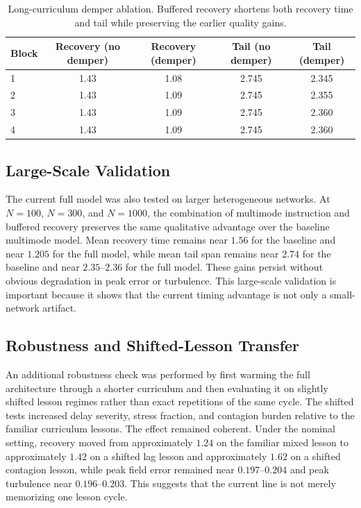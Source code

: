 \documentclass[12pt,a4paper]{article}
\begin{document}
\begin{table}[H]
    \centering
    \begin{tabular}{lcccc}
        \toprule
        Block & Recovery (no demper) & Recovery (demper) & Tail (no demper) & Tail (demper) \\
        \midrule
        1 & 1.43 & 1.08 & 2.745 & 2.345 \\
        2 & 1.43 & 1.09 & 2.745 & 2.355 \\
        3 & 1.43 & 1.09 & 2.745 & 2.360 \\
        4 & 1.43 & 1.09 & 2.745 & 2.360 \\
        \bottomrule
    \end{tabular}
    \caption{Long-curriculum demper ablation. Buffered recovery shortens both recovery time and tail while preserving the earlier quality gains.}
    \label{tab:demper_ablation}
\end{table}

\subsection{Large-Scale Validation}
The current full model was also tested on larger heterogeneous networks. At $N=100$, $N=300$, and $N=1000$, the combination of multimode instruction and buffered recovery preserves the same qualitative advantage over the baseline multimode model. Mean recovery time remains near $1.56$ for the baseline and near $1.205$ for the full model, while mean tail span remains near $2.74$ for the baseline and near $2.35$--$2.36$ for the full model. These gains persist without obvious degradation in peak error or turbulence. This large-scale validation is important because it shows that the current timing advantage is not only a small-network artifact.

\subsection{Robustness and Shifted-Lesson Transfer}
An additional robustness check was performed by first warming the full architecture through a shorter curriculum and then evaluating it on slightly shifted lesson regimes rather than exact repetitions of the same cycle. The shifted tests increased delay severity, stress fraction, and contagion burden relative to the familiar curriculum lessons. The effect remained coherent. Under the nominal setting, recovery moved from approximately $1.24$ on the familiar mixed lesson to approximately $1.42$ on a shifted lag lesson and approximately $1.62$ on a shifted contagion lesson, while peak field error remained near $0.197$--$0.204$ and peak turbulence near $0.196$--$0.203$. This suggests that the current line is not merely memorizing one lesson cycle.
\end{document}
